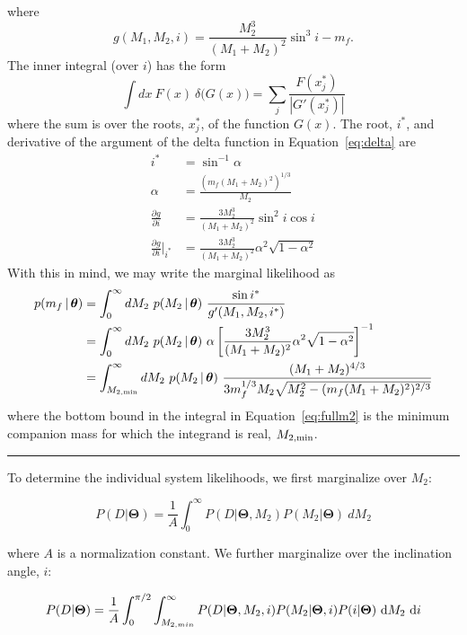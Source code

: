 \documentclass[letterpaper,12pt,preprint]{aastex}
\newcommand{\given}{\,|\,}
\newcommand{\bs}[1]{\boldsymbol{#1}}
\begin{document}
where
\begin{equation}
	g(M_1,M_2,i) = \frac{M_2^3}{(M_1+M_2)^2}\sin^3 i - m_f.
\end{equation}
The inner integral (over $i$) has the form
\begin{equation}
    \int dx~F(x)~\delta{(G(x)}) = \sum_j \frac{F(x^*_j)}{|G'(x^*_j)|}
\end{equation}
where the sum is over the roots, $x^*_j$, of the function $G(x)$. The root, $i^*$, and derivative of the argument of the delta function in Equation~\ref{eq:delta} are 
\begin{align}
	i^* &= \sin^{-1}\alpha\\
	\alpha &= \frac{(m_f(M_1+M_2)^2)^{1/3}}{M_2}\\
	\frac{\partial g}{\partial i} &= \frac{3M_2^3}{(M_1+M_2)^2}\sin^2 i \cos i\\
	\frac{\partial g}{\partial i}\bigg\rvert_{i^*} &= \frac{3M_2^3}{(M_1+M_2)^2} \alpha^2 \sqrt{1 - \alpha^2}
\end{align}
With this in mind, we may write the marginal likelihood as
\begin{align}
	p(m_f \given \bs{\theta}) &= \int_{0}^\infty dM_2~p(M_2 \given \bs{\theta})~\frac{\sin i^*}{g'(M_1,M_2,i^*)}\\
	&= \int_{0}^\infty dM_2~p(M_2 \given \bs{\theta})~\alpha\left[\frac{3M_2^3}{(M_1+M_2)^2} \alpha^2 \sqrt{1 - \alpha^2}\right]^{-1}\\
	&= \int_{M_{2,{\rm min}}}^\infty dM_2~p(M_2 \given \bs{\theta})~\frac{(M_1+M_2)^{4/3}}{3m_f^{1/3}M_2\sqrt{M_2^2 - (m_f(M_1+M_2)^2)^{2/3}}}\label{eq:fullm2}
\end{align}
where the bottom bound in the integral in Equation~\ref{eq:fullm2} is the minimum companion mass for which the integrand is real, $M_{2,{\rm min}}$.

\vspace{2em}
\hrule

To determine the individual system likelihoods, we first marginalize over $M_2$:

\begin{equation}
P(D|\mathbf{\Theta}) = \frac{1}{A} \int_0^{\infty} P(D |\mathbf{\Theta}, M_2) P	(M_2|\mathbf{\Theta})\ dM_2 
\end{equation}

where $A$ is a normalization constant. We further marginalize over the inclination angle, $i$:

\begin{equation}
P(D|\mathbf{\Theta}) = \frac{1}{A} \int_0^{\pi/2} \int_{M_{2,min}}^{\infty} P(D | \mathbf{\Theta}, M_2, i) P(M_2|\mathbf{\Theta}, i) P(i | \mathbf{\Theta})\ {\rm d}M_2\ {\rm d}i
\end{equation}
\end{document}
